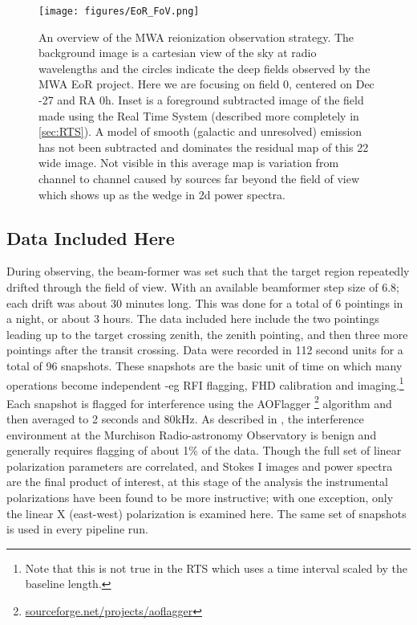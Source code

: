 \documentclass[twolcolumn,iop]{emulateapj}
\begin{document}
\begin{figure}[htbp]
\begin{center}
\texttt{[image: figures/EoR\_FoV.png]}
\caption{An overview of the MWA reionization observation strategy. The background image is a cartesian view of the sky at radio wavelengths and the circles indicate the deep fields observed by the MWA EoR project.  Here we are focusing on field 0, centered on Dec -27\arcdeg{} and RA 0h. Inset is a foreground subtracted image of the field made using the Real Time System (described more completely in \ref{sec:RTS}). A model of smooth (galactic and unresolved) emission has not been subtracted and dominates the residual map of this 22\arcdeg{} wide image. Not visible in this average map is variation from channel to channel caused by sources far beyond the field of view which shows up as the wedge in 2d power spectra.}
\label{fig:fields}
\end{center}
\end{figure}

\subsection{Data Included Here}
During observing, the beam-former was set such that the target region repeatedly drifted through the field of view.  With an available beamformer step size of 6.8\arcdeg; each drift was about 30 minutes long.  This was done for a total of 6 pointings in a night, or about 3 hours. The data included here include the two pointings leading up to the target crossing zenith, the zenith pointing, and then three more pointings after the transit crossing.  Data were recorded in 112 second units for a total of 96 snapshots. These snapshots are the basic unit of time on which many operations become independent -eg RFI flagging, FHD calibration and imaging.\footnote{Note that this is not true in the RTS which uses a time interval scaled by the baseline length.}   Each snapshot is flagged for interference using the AOFlagger \citep{offringa:2010rfim.workE..36O}\footnote{ \url{sourceforge.net/projects/aoflagger} } algorithm and then averaged to 2 seconds and 80kHz.  As described in \cite{2015PASA...32....8O}, the interference environment at the Murchison Radio-astronomy Observatory is benign and generally requires flagging of about 1\% of the data.   Though the full set of linear polarization parameters are correlated, and Stokes I images and power spectra are the final product of interest, at this stage of the analysis the instrumental polarizations have been found to be more instructive; with one exception, only the linear X (east-west) polarization is examined here.   The same set of snapshots is used in every pipeline run.
\end{document}
